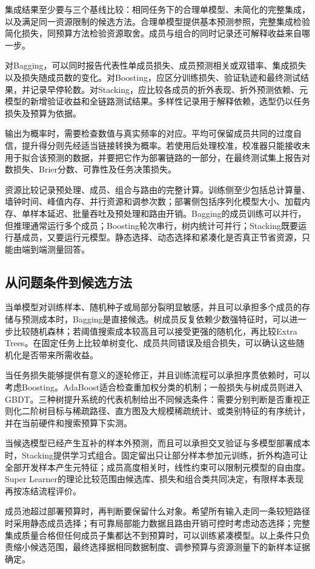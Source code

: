集成结果至少要与三个基线比较：相同任务下的合理单模型、未简化的完整集成，以及满足同一资源限制的候选方法。合理单模型提供基本预测参照，完整集成检验简化损失，同预算方法检验资源取舍。成员与组合的同时记录还可解释收益来自哪一步。

对Bagging，可以同时报告代表性单成员损失、成员预测相关或双错率、集成损失以及损失随成员数的变化。对Boosting，应区分训练损失、验证轨迹和最终测试结果，并记录早停轮数。对Stacking，应比较各成员的折外表现、折外预测依赖、元模型的新增验证收益和全链路测试结果。多样性记录用于解释依赖，选型仍以任务损失及预算为依据。

输出为概率时，需要检查数值与真实频率的对应。平均可保留成员共同的过度自信，提升得分则先经适当链接转换为概率。若使用后处理校准，校准器只能接收未用于拟合该预测的数据，并要把它作为部署链路的一部分，在最终测试集上报告对数损失、Brier分数、可靠性及任务决策损失。

资源比较记录预处理、成员、组合与路由的完整计算。训练侧至少包括总计算量、墙钟时间、峰值内存、并行资源和调参次数；部署侧包括序列化模型大小、加载内存、单样本延迟、批量吞吐及预处理和路由开销。Bagging的成员训练可以并行，但推理通常运行多个成员；Boosting轮次串行，树内统计可并行；Stacking既要运行基成员，又要运行元模型。静态选择、动态选择和紧凑化是否真正节省资源，只能由端到端测量回答。

\subsection{从问题条件到候选方法}
\label{sec:ensemble-method-selection}

当单模型对训练样本、随机种子或局部分裂明显敏感，并且可以承担多个成员的存储与预测成本时，Bagging是直接候选。树成员反复依赖少数强特征时，可以进一步比较随机森林；若阈值搜索成本较高且可以接受更强的随机化，再比较Extra Trees。在固定任务上比较单树变化、成员共同错误及组合损失，可以确认这些随机化是否带来所需收益。

当任务损失能够提供有意义的逐轮修正，并且训练流程可以承担序贯依赖时，可以考虑Boosting。AdaBoost适合检查重加权分类的机制；一般损失与树成员则进入GBDT。三种树提升系统的代表机制给出不同候选条件：需要分别判断是否重视正则化二阶树目标与稀疏路径、直方图及大规模稀疏统计、或类别特征的有序统计，并在当前硬件和搜索预算下实测。

当候选模型已经产生互补的样本外预测，而且可以承担交叉验证与多模型部署成本时，Stacking提供学习式组合。固定留出只让部分样本参加元训练，折外构造可让全部开发样本产生元特征；成员高度相关时，线性约束可以限制元模型的自由度。Super Learner的理论比较范围由候选库、损失和组合类共同决定，有限样本表现再按冻结流程评价。

成员池超过部署预算时，再判断要保留什么对象。希望所有输入走同一条较短路径时采用静态成员选择；有可靠局部能力数据且路由开销可控时考虑动态选择；完整集成质量合格但任何成员子集都达不到预算时，可以训练紧凑模型。以上条件只负责缩小候选范围，最终选择据相同数据制度、调参预算与资源测量下的新样本证据确定。
